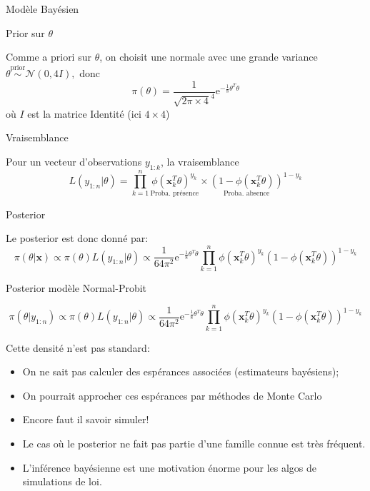 \documentclass[9pt,ignorenonframetext,]{beamer}
\providecommand{\tightlist}{%
  \setlength{\itemsep}{0pt}\setlength{\parskip}{0pt}}
\begin{document}
\begin{frame}{Modèle Bayésien}
\protect\hypertarget{moduxe8le-bayuxe9sien}{}

\begin{block}{Prior sur \(\theta\)}

Comme a priori sur \(\theta\), on choisit une normale avec une grande
variance\(\theta \overset{\text{prior}}{\sim} \mathcal{N}(0, 4 I),\)
donc
\[\pi(\theta) = \frac{1}{\sqrt{2\pi \times 4}^4} \text{e}^{-\frac{1}{8}\theta^T\theta}\]
où \(I\) est la matrice Identité (ici \(4 \times 4\)) \pause

\end{block}

\begin{block}{Vraisemblance}

Pour un vecteur d'observations \(y_{1:k}\), la vraisemblance
\[L(y_{1:n}\vert \theta) = \prod_{k = 1}^n \underset{\text{Proba. présence}}{\phi(\mathbf{x}_k^T\theta)^{y_k}}\times \underset{\text{Proba. absence}}{(1 - \phi(\mathbf{x}_k^T\theta))}^{1 - y_k}\]
\pause

\end{block}

\begin{block}{Posterior}

Le posterior est donc donné par:
\[\pi(\theta \vert \mathbf{x}) \propto \pi(\theta) L(y_{1:n}\vert \theta) \propto \frac{1}{64\pi^2}\text{e}^{-\frac{1}{8}\theta^T\theta} \prod_{k = 1}^n \phi(\mathbf{x}_k^T\theta)^{y_k} (1 - \phi(\mathbf{x}_k^T\theta))^{1 - y_k}\]

\end{block}

\end{frame}

\begin{frame}{Posterior modèle Normal-Probit}
\protect\hypertarget{posterior-moduxe8le-normal-probit}{}

\[\pi(\theta \vert y_{1:n}) \propto \pi(\theta) L(y_{1:n}\vert \theta) \propto \frac{1}{64\pi^2}\text{e}^{-\frac{1}{8}\theta^T\theta} \prod_{k = 1}^n \phi(\mathbf{x}_k^T\theta)^{y_k} (1 - \phi(\mathbf{x}_k^T\theta))^{1 - y_k}\]

Cette densité n'est pas standard:

\begin{itemize}
\tightlist
\item
  On ne sait pas calculer des espérances associées (estimateurs
  bayésiens);
\item
  On pourrait approcher ces espérances par méthodes de Monte Carlo\pause
\item
  Encore faut il savoir simuler!\pause
\item
  Le cas où le posterior ne fait pas partie d'une famille connue est
  très fréquent.
\item
  L'inférence bayésienne est une motivation énorme pour les algos de
  simulations de loi.
\end{itemize}

\end{frame}
\end{document}
